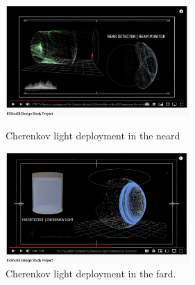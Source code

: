 \documentclass{webofc}
\begin{document}
\begin{figure}[ht]
    \centering
    \begin{minipage}{0.45\textwidth}
        \centering
        \includegraphics[width=7cm,clip]{youtube_neard}
        \caption{Cherenkov light deployment in the neard}
        \label{fig-youtube-neard}
    \end{minipage}\hfill
    \begin{minipage}{0.45\textwidth}
        \centering
        \includegraphics[width=7cm,clip]{youtube_fard}
        \caption{Cherenkov light deployment in the fard.}
        \label{fig-youtube-fard}
    \end{minipage}
\end{figure}
\end{document}
